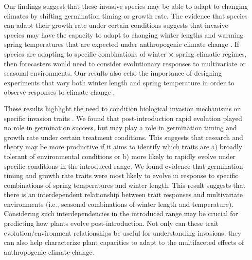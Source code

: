 \documentclass[11pt]{article}\usepackage[]{graphicx}\usepackage[]{color}
\begin{document}
	Our findings suggest that these invasive species may be able to adapt to changing climates by shifting germination timing or growth rate. The evidence that species can adapt their growth rate under certain conditions suggests that invasive species may have the capacity to adapt to changing winter lengths and warming spring temperatures that are expected under anthropogenic climate change \parencite{IPCC2015}. If species are adapting to specific combinations of winter $\times$ spring climatic regimes, then forecasters would need to consider evolutionary responses to multivariate  or seasonal environments. Our results also echo the importance of designing experiments that vary both winter length and spring temperature in order to observe responses to climate change \parencite[e.g.,][]{Bernareggi2016}. 
	
	These results highlight the need to condition biological invasion mechanisms on specific invasion traits \parencite{Maillet2000}. We found that post-introduction rapid evolution played no role in germination success, but may play a role in germination timing and growth rate under certain treatment conditions. This suggests that research and theory may be more productive if it aims to  identify which traits are a) broadly tolerant of environmental conditions or b) more likely to rapidly evolve under specific conditions in the introduced range. We found evidence that germination timing and growth rate traits were most likely to evolve in response to specific combinations of spring temperatures and winter length. This result suggests that there is an interdependent relationship between trait responses and  multivariate environments (i.e., seasonal combinations of winter length and temperature). Considering such interdependencies in the introduced range may be crucial for predicting how plants evolve post-introduction. 
Not only can these trait evolution/environment relationships be useful for understanding invasions, they can also help characterize plant capacities to adapt to the multifaceted effects of anthropogenic climate change. 
\end{document}
